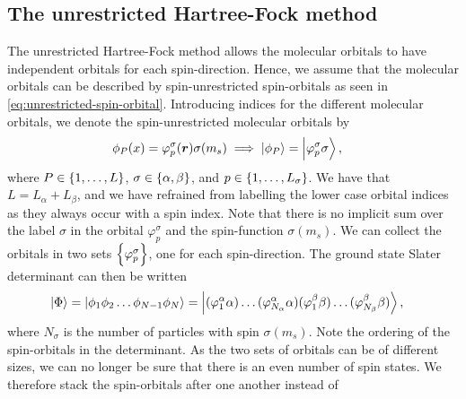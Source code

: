         \subsection{The unrestricted Hartree-Fock method}
            The unrestricted Hartree-Fock method allows the molecular orbitals
            to have independent orbitals for each spin-direction.
            Hence, we assume that the molecular orbitals can be described by
            spin-unrestricted spin-orbitals as seen in
            \autoref{eq:unrestricted-spin-orbital}.
            Introducing indices for the different molecular orbitals, we denote
            the spin-unrestricted molecular orbitals by
            \begin{align}
                \phi_P(x)
                &=
                \varphi^{\sigma}_{p}(\boldsymbol{r})
                \sigma(m_s)
                \implies
                \ket{\phi_P}
                = \ket{\varphi^{\sigma}_{p}\sigma},
            \end{align}
            where $P \in \left\{ 1, \dots, L \right\}$, $\sigma \in \left\{ \alpha, \beta \right\}$,
            and $p \in \left\{ 1, \dots, L_{\sigma} \right\}$.
            We have that $L = L_{\alpha} + L_{\beta}$, and we have refrained
            from labelling the lower case orbital indices as they always occur
            with a spin index.
            Note that there is no implicit sum over the label $\sigma$ in the
            orbital $\varphi^{\sigma}_{p}$ and the spin-function $\sigma(m_s)$.
            We can collect the orbitals in two sets
            $\left\{ \varphi^{\sigma}_{p} \right\}$, one for each spin-direction.
            The ground state Slater determinant can then be written
            \begin{align}
                \ket{\Phi}
                &=
                \ket{\phi_1 \phi_2 \dots \phi_{N - 1} \phi_N}
                =
                \ket{
                    (\varphi^{\alpha}_{1}\alpha)
                    \dots
                    (\varphi^{\alpha}_{N_{\alpha}}\alpha)
                    (\varphi^{\beta}_{1}\beta)
                    \dots
                    (\varphi^{\beta}_{N_{\beta}}\beta)
                },
            \end{align}
            where $N_{\sigma}$ is the number of particles with spin
            $\sigma(m_s)$.
            Note the ordering of the spin-orbitals in the determinant.
            As the two sets of orbitals can be of different sizes, we can no
            longer be sure that there is an even number of spin states.
            We therefore stack the spin-orbitals after one another instead of
